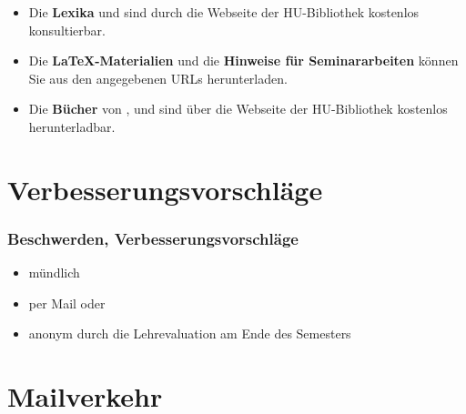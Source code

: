 \begin{frame}

\begin{itemize}
	\item Die \textbf{Lexika} \citet{Glueck&Roedel16a} und \citet{Schierholz&Co18} sind durch die Webseite der HU-Bibliothek kostenlos konsultierbar.
	
	\item Die \textbf{\LaTeX -Materialien} \citep{Freitag&MyP15a} und die \textbf{Hinweise für Seminararbeiten} \citep{MyP17c} können Sie aus den angegebenen URLs herunterladen.
	
	\item Die \textbf{Bücher} von \citet{Albert&Marx10a}, \citet{Meindl11a} und \citet{Rothstein11a} sind über die Webseite der HU-Bibliothek kostenlos herunterladbar.
\end{itemize}
\end{frame}


\section{Verbesserungsvorschläge}

\begin{frame}
\frametitle{Beschwerden, Verbesserungsvorschläge}

\begin{itemize}
	\item mündlich
	\item per Mail oder 
	\item anonym durch die Lehrevaluation am Ende des Semesters
\end{itemize}
\end{frame}


\section{Mailverkehr}

